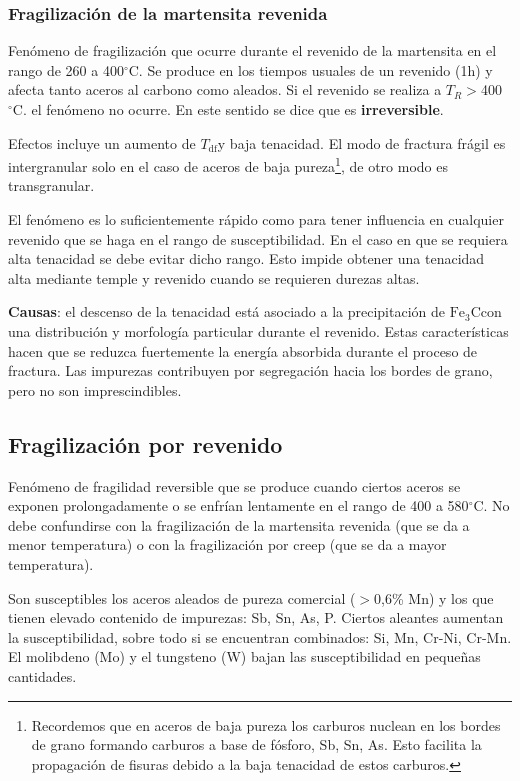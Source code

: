 \documentclass{article}
\newcommand{\Tdf}{\ensuremath{T_{\mathrm{df}}}}
\newcommand{\grad}{\ensuremath{^\circ \mathrm{C}}}
\newcommand{\cementita}{\ensuremath{\mathrm{Fe}_3 \mathrm{C}}}
\begin{document}
\subsubsection{Fragilización de la martensita revenida}
Fenómeno de fragilización que ocurre durante el revenido de la martensita en el rango de 260 a 400\grad{}. Se produce en los tiempos usuales de un revenido (1h) y afecta tanto aceros al carbono como aleados. Si el revenido se realiza a $T_R>$400\grad. el fenómeno no ocurre. En este sentido se dice que es \textbf{irreversible}.

Efectos incluye un aumento de \Tdf y baja tenacidad. El modo de fractura frágil es intergranular solo en el caso de aceros de baja pureza\footnote{Recordemos que en aceros de baja pureza los carburos nuclean en los bordes de grano formando carburos a base de fósforo, Sb, Sn, As. Esto facilita la propagación de fisuras debido a la baja tenacidad de estos carburos.}, de otro modo es transgranular.

El fenómeno es lo suficientemente rápido como para tener influencia en cualquier revenido que se haga en el rango de susceptibilidad. En el caso en que se requiera alta tenacidad se debe evitar dicho rango. Esto impide obtener una tenacidad alta mediante temple y revenido cuando se requieren durezas altas.

\textbf{Causas}: el descenso de la tenacidad está asociado a la precipitación de \cementita con una distribución y morfología particular durante el revenido. Estas características hacen que se reduzca fuertemente la energía absorbida durante el proceso de fractura. Las impurezas contribuyen por segregación hacia los bordes de grano, pero no son imprescindibles.

\subsection{Fragilización por revenido}
Fenómeno de fragilidad reversible que se produce cuando ciertos aceros se exponen prolongadamente o se enfrían lentamente en el rango de 400 a 580\grad{}. No debe confundirse con la fragilización de la martensita revenida (que se da a menor temperatura) o con la fragilización por creep (que se da a mayor temperatura).

Son susceptibles los aceros aleados de pureza comercial ($>$0,6\% Mn) y los que tienen elevado contenido de impurezas: Sb, Sn, As, P. Ciertos aleantes aumentan la susceptibilidad, sobre todo si se encuentran combinados: Si, Mn, Cr-Ni, Cr-Mn. El molibdeno (Mo) y el tungsteno (W) bajan las susceptibilidad en pequeñas cantidades.
\end{document}
